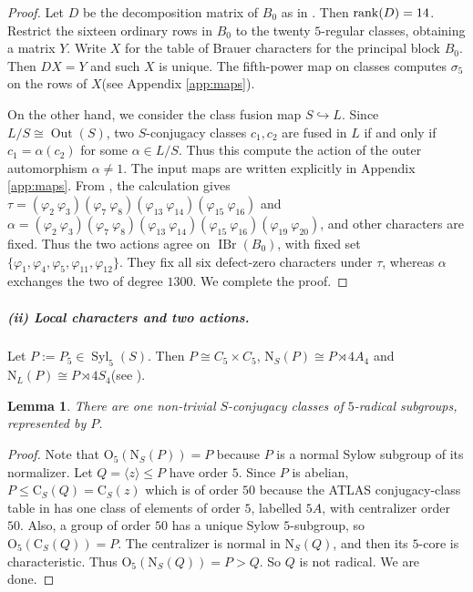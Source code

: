 \documentclass[11pt,a4paper]{article}
\numberwithin{equation}{section}
\newtheorem{lemma}[theorem]{Lemma}
\theoremstyle{definition}
\theoremstyle{remark}
\newcommand{\IBr}{\operatorname{IBr}}
\newcommand{\Out}{\operatorname{Out}}
\newcommand{\Syl}{\operatorname{Syl}}
\newcommand{\OO}{\mathrm{O}}
\newcommand{\NN}{\mathrm N}
\newcommand{\CC}{\mathrm C}
\begin{document}
\begin{proof}
Let \(D\) be the  decomposition matrix of $B_0$ as in \cite[Block. 1]{T}. Then ${\rm rank}(D)=14$.
Restrict the sixteen ordinary rows in $B_0$ to the twenty \(5\)-regular classes, obtaining a matrix \(Y\). Write \(X\) for the table of Brauer characters for the principal block $B_0$. Then  $DX=Y$ and such 
$X$ is unique. The fifth-power map on classes computes $\sigma_5$ on the rows of $X$(see Appendix \ref{app:maps}).

On the other hand, we consider the class fusion map 
$S\hookrightarrow L$. Since $L/S\cong \Out(S)$,
two \(S\)-conjugacy classes \(c_1,c_2\) are fused in \(L\) if and only if $c_1=\alpha(c_2)$ for some $\alpha\in L/S$.
Thus this compute the action of the outer automorphism $\alpha\neq 1$. The input maps are written explicitly in  Appendix \ref{app:maps}. From \cite{T,OrdData}, the calculation gives  $\tau
=(\varphi_2\ \varphi_3)(\varphi_7\ \varphi_8)(\varphi_{13}\ \varphi_{14})(\varphi_{15}\ \varphi_{16})$ and $\alpha=(\varphi_2\ \varphi_3)(\varphi_7\ \varphi_8)(\varphi_{13}\ \varphi_{14})(\varphi_{15}\ \varphi_{16})(\varphi_{19}\ \varphi_{20})$, and other characters are fixed. 
Thus the two actions agree on $\IBr(B_0)$, with fixed set
$\{\varphi_1, \varphi_4,\varphi_5,\varphi_{11},\varphi_{12} \}$. They fix all six defect-zero characters under $\tau$, whereas $\alpha$ exchanges the two of degree $1300$.
We complete the proof.
\end{proof}


\subparagraph{(ii) Local characters and two actions.}
Let \(P:=P_5\in\Syl_5(S)\). Then $P\cong C_5\times C_5$, $\NN_S(P)\cong P\rtimes 4A_4$ and $\NN_L(P)\cong P\rtimes 4S_4$(see \cite{T}). 
\begin{lemma}\label{p5:prop:radical}
There are one non-trivial \(S\)-conjugacy classes of \(5\)-radical subgroups, represented by $P$.
\end{lemma}
\begin{proof}
Note that \(\OO_5(\NN_S(P))=P\) because \(P\) is a normal Sylow subgroup of its normalizer. 
Let \(Q=\langle z\rangle\leq P\) have
order \(5\). Since \(P\) is abelian, $P\leq\CC_S(Q)=\CC_S(z)$ which is of order $50$ because the ATLAS conjugacy-class table in \cite{A} has one class of elements of order $5$, labelled $5A$, with centralizer order $50$. Also, a group of order $50$ has a unique Sylow $5$-subgroup, so
\(\OO_5(\CC_S(Q))=P\). The centralizer is normal in \(\NN_S(Q)\), and then its \(5\)-core is characteristic. 
Thus $\OO_5(\NN_S(Q))=P>Q$. So \(Q\) is not radical. 
We are done.
\end{proof}
\end{document}
